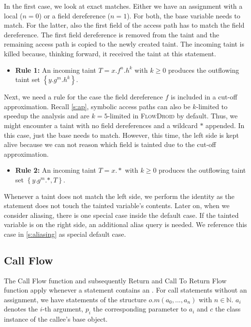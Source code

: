 \documentclass[../draft.tex]{subfiles}
\begin{document}
    In the first case, we look at exact matches. Either we have an assignment with a local ($n=0$) or a field dereference ($n=1$). For both, the base variable needs to match. For the latter, also the first field of the access path has to match the field dereference.
    The first field dereference is removed from the taint and the remaining access path is copied to the newly created taint. The incoming taint is killed because, thinking forward, it received the taint at this statement.
    \begin{itemize}
        \item[] \textbf{Rule 1:} An incoming taint $T = x.f^n.h^k$ with $k \geq 0$ produces the outflowing taint set $\left\{y.g^m.h^k\right\}$.
    \end{itemize}

    Next, we need a rule for the case the field dereference $f$ is included in a cut-off approximation.
    Recall \autoref{s:ap}, symbolic access paths can also be $k$-limited to speedup the analysis and are $k=5$-limited in \textsc{FlowDroid} by default.
    Thus, we might encounter a taint with no field dereferences and a wildcard $*$ appended.
    In this case, just the base needs to match.
    However, this time, the left side is kept alive because we can not reason which field is tainted due to the cut-off approximation.
    \begin{itemize}
        \item[] \textbf{Rule 2:} An incoming taint $T = x.*$ with $k \geq 0$ produces the outflowing taint set $\left\{y.g^m.*, T\right\}$.
    \end{itemize}

    Whenever a taint does not match the left side, we perform the identity as the statement does not touch the tainted variable's contents.
    Later on, when we consider aliasing, there is one special case inside the default case.
    If the tainted variable is on the right side, an additional alias query is needed.
    We reference this case in \autoref{s:aliasing} as special default case.

    \subsection{Call Flow}
    The Call Flow function and subsequently Return and Call To Return Flow function apply whenever a statement contains an .
    For call statements without an assignment, we have statements of the structure $o.m(a_0, ..., a_n)$ with $n \in \mathbb{N}$. $a_i$ denotes the $i$-th argument, $p_i$ the corresponding parameter to $a_i$ and $c$ the class instance of the callee's base object.
\end{document}
